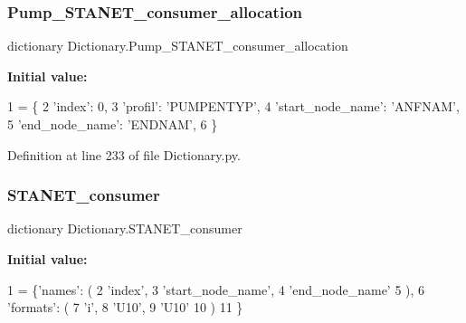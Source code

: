 \subsubsection{\texorpdfstring{Pump\+\_\+\+S\+T\+A\+N\+E\+T\+\_\+consumer\+\_\+allocation}{Pump\_STANET\_consumer\_allocation}}
{\footnotesize\ttfamily dictionary Dictionary.\+Pump\+\_\+\+S\+T\+A\+N\+E\+T\+\_\+consumer\+\_\+allocation}

{\bfseries Initial value\+:}
\begin{DoxyCode}
1 =  \{
2                                 \textcolor{stringliteral}{'index'}: 0,
3                                 \textcolor{stringliteral}{'profil'}: \textcolor{stringliteral}{'PUMPENTYP'},
4                                 \textcolor{stringliteral}{'start\_node\_name'}: \textcolor{stringliteral}{'ANFNAM'},
5                                 \textcolor{stringliteral}{'end\_node\_name'}: \textcolor{stringliteral}{'ENDNAM'},
6                                 \}
\end{DoxyCode}


Definition at line 233 of file Dictionary.\+py.

\mbox{\label{namespace_dictionary_a4d548616b60c21d9481e34dc5f56ff6d}} 
\subsubsection{\texorpdfstring{S\+T\+A\+N\+E\+T\+\_\+consumer}{STANET\_consumer}}
{\footnotesize\ttfamily dictionary Dictionary.\+S\+T\+A\+N\+E\+T\+\_\+consumer}

{\bfseries Initial value\+:}
\begin{DoxyCode}
1 =        \{\textcolor{stringliteral}{'names'}: (
2                                 \textcolor{stringliteral}{'index'},
3                                 \textcolor{stringliteral}{'start\_node\_name'},
4                                 \textcolor{stringliteral}{'end\_node\_name'}
5                                 ),
6                        \textcolor{stringliteral}{'formats'}: (
7                                 \textcolor{stringliteral}{'i'},
8                                 \textcolor{stringliteral}{'U10'},
9                                 \textcolor{stringliteral}{'U10'}
10                                 )
11                                \}
\end{DoxyCode}


